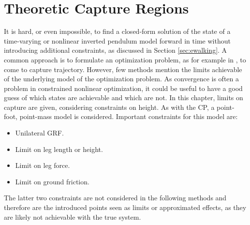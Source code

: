 %
\chapter{Theoretic Capture Regions}\label{chap:regions}
It is hard, or even impossible, to find a closed-form solution of the state of a time-varying or nonlinear inverted pendulum model forward in time without introducing additional constraints, as discussed in Section \ref{sec:ewalking}. A common approach is to formulate an optimization problem, as for example in \cite{caron2018capturability}, to come to capture trajectory. However, few methods mention the limits achievable of the underlying model of the optimization problem. As convergence is often a problem in constrained nonlinear optimization, it could be useful to have a good guess of which states are achievable and which are not. In this chapter, limits on capture are given, considering constraints on height. As with the \ac{CP}, a point-foot, point-mass model is considered. Important constraints for this model are:
\begin{itemize}
	\item Unilateral \ac{GRF}.
	\item Limit on leg length or height.
	\item Limit on leg force.
	\item Limit on ground friction.
\end{itemize}
The latter two constraints are not considered in the following methods and therefore are the introduced points seen as limits or approximated effects, as they are likely not achievable with the true system.

